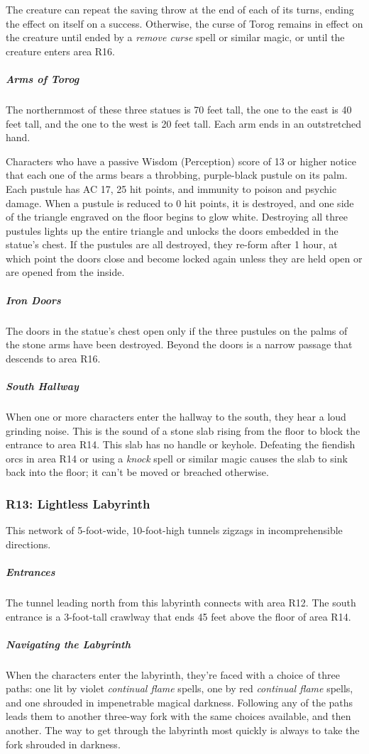 \documentclass[10pt,a4paper,twoside,fancy,bg=print,twocolumn,openany,nodeprecatedcode]{dndbook}
\begin{document}
The creature can repeat the saving throw at the end of each of its turns, ending the effect on itself on a success. Otherwise, the curse of Torog remains in effect on the creature until ended by a \textit{remove curse} spell or similar magic, or until the creature enters area R16.

\subparagraph{Arms of Torog}
The northernmost of these three statues is 70 feet tall, the one to the east is 40 feet tall, and the one to the west is 20 feet tall. Each arm ends in an outstretched hand.

Characters who have a passive Wisdom (Perception) score of 13 or higher notice that each one of the arms bears a throbbing, purple-black pustule on its palm. Each pustule has AC 17, 25 hit points, and immunity to poison and psychic damage. When a pustule is reduced to 0 hit points, it is destroyed, and one side of the triangle engraved on the floor begins to glow white. Destroying all three pustules lights up the entire triangle and unlocks the doors embedded in the statue's chest. If the pustules are all destroyed, they re-form after 1 hour, at which point the doors close and become locked again unless they are held open or are opened from the inside.

\subparagraph{Iron Doors}
The doors in the statue's chest open only if the three pustules on the palms of the stone arms have been destroyed. Beyond the doors is a narrow passage that descends to area R16.

\subparagraph{South Hallway}
When one or more characters enter the hallway to the south, they hear a loud grinding noise. This is the sound of a stone slab rising from the floor to block the entrance to area R14. This slab has no handle or keyhole. Defeating the fiendish orcs in area R14 or using a \textit{knock} spell or similar magic causes the slab to sink back into the floor; it can't be moved or breached otherwise.

\subsubsection{R13: Lightless Labyrinth}
This network of 5-foot-wide, 10-foot-high tunnels zigzags in incomprehensible directions.

\subparagraph{Entrances}
The tunnel leading north from this labyrinth connects with area R12. The south entrance is a 3-foot-tall crawlway that ends 45 feet above the floor of area R14.

\subparagraph{Navigating the Labyrinth}
When the characters enter the labyrinth, they're faced with a choice of three paths: one lit by violet \textit{continual flame} spells, one by red \textit{continual flame} spells, and one shrouded in impenetrable magical darkness. Following any of the paths leads them to another three-way fork with the same choices available, and then another. The way to get through the labyrinth most quickly is always to take the fork shrouded in darkness.
\end{document}
